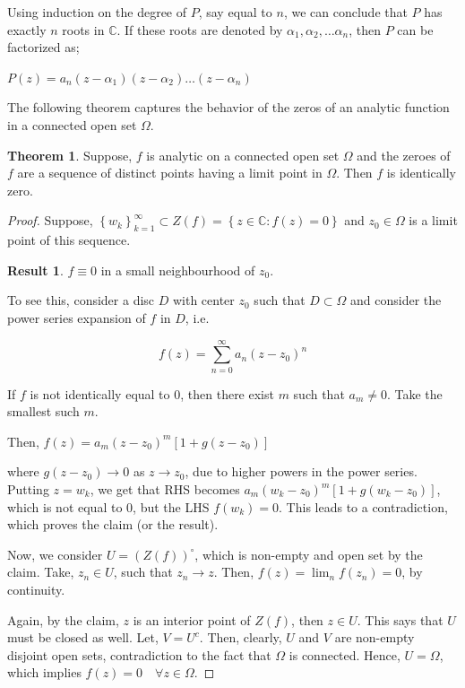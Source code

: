 \documentclass[12pt]{article}
\newcommand{\C}{\mathbb{C}}
\theoremstyle{definition}
\newtheorem{thm}{Theorem}
\newtheorem{res}{Result}
\newenvironment{theorem}{
\begin{tcolorbox}[colback=green!5!white,colframe=green!75!black, parbox = false]\begin{thm} }{\end{thm}\end{tcolorbox} }
\newenvironment{result}{
\begin{tcolorbox}[colback=green!5!white,colframe=green!75!black, parbox = false]\begin{res} }{\end{res}\end{tcolorbox} }
\newenvironment{remark}{
\begin{tcolorbox}[colback=blue!5!white,colframe=blue!75!black,title=Remark, parbox = false] }{\end{tcolorbox} }
\begin{document}
\begin{remark}
    Using induction on the degree of $P$, say equal to $n$, we can conclude that $P$ has exactly $n$ roots in $\C$. If these roots are denoted by $\alpha_1, \alpha_2, \dots \alpha_n$, then $P$ can be factorized as;

    $P(z) = a_n (z - \alpha_1)(z - \alpha_2)\dots (z - \alpha_n)$
\end{remark}

The following theorem captures the behavior of the zeros of an analytic function in a connected open set $\Omega$.

\begin{theorem}
    Suppose, $f$ is analytic on a connected open set $\Omega$ and the zeroes of $f$ are a sequence of distinct points having a limit point in $\Omega$. Then $f$ is identically zero.
\end{theorem}

\begin{proof}
    Suppose, $\left\{ w_k \right\}_{k=1}^{\infty} \subset Z(f) = \left\{ z\in\C : f(z) = 0\right\}$ and $z_0 \in \Omega$ is a limit point of this sequence.

    \begin{result}
        $f \equiv 0$ in a small neighbourhood of $z_0$. 
    \end{result}

    To see this, consider a disc $D$ with center $z_0$ such that $D \subset \Omega$ and consider the power series expansion of $f$ in $D$, i.e.

    $$f(z) = \sum_{n=0}^{\infty} a_n (z - z_0)^n$$

    If $f$ is not identically equal to $0$, then there exist $m$ such that $a_m \neq 0$. Take the smallest such $m$.

    Then, $f(z) = a_m(z - z_0)^m \left[ 1  + g(z - z_0) \right]$

    where $g(z - z_0) \rightarrow 0$ as $z \rightarrow z_0$, due to higher powers in the power series. Putting $z = w_k$, we get that RHS becomes $a_m(w_k - z_0)^m \left[ 1 + g(w_k - z_0) \right]$, which is not equal to $0$, but the LHS $f(w_k) = 0$. This leads to a contradiction, which proves the claim (or the result).

    Now, we consider $U = (Z(f))^\circ$, which is non-empty and open set by the claim. Take, $z_n \in U$, such that $z_n \rightarrow z$. Then, $f(z) = \lim_{n} f(z_n) = 0$, by continuity.

    Again, by the claim, $z$ is an interior point of $Z(f)$, then $z \in U$. This says that $U$ must be closed as well. Let, $V = U^c$. Then, clearly, $U$ and $V$ are non-empty disjoint open sets, contradiction to the fact that $\Omega$ is connected. Hence, $U = \Omega$, which implies $f(z) = 0 \quad \forall z \in \Omega$.

\end{proof}
\end{document}
